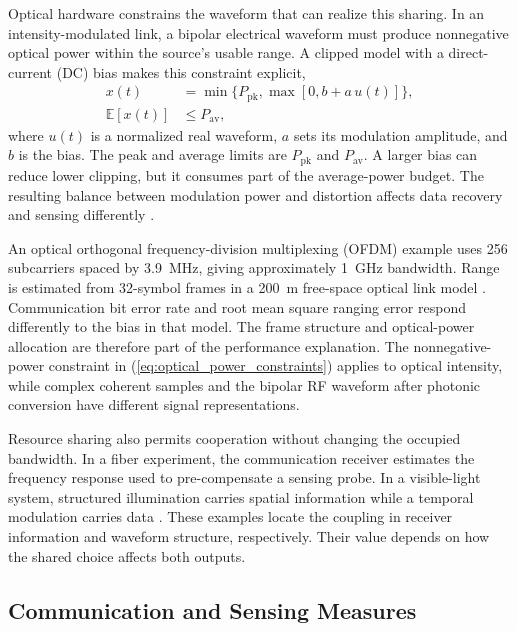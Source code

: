 Optical hardware constrains the waveform that can realize this sharing.
In an intensity-modulated link, a bipolar electrical waveform must produce
nonnegative optical power within the source's usable range. A clipped model
with a direct-current (DC) bias makes this constraint explicit,
\begin{equation}
\begin{aligned}
x(t)&=\min\{P_{\mathrm{pk}},\max[0,b+a\,u(t)]\},\\
\mathbb{E}[x(t)]&\leq P_{\mathrm{av}},
\end{aligned}
\label{eq:optical_power_constraints}
\end{equation}
where $u(t)$ is a normalized real waveform, $a$ sets its modulation amplitude,
and $b$ is the bias. The peak and average limits are $P_{\mathrm{pk}}$ and
$P_{\mathrm{av}}$. A larger bias can reduce lower clipping, but it consumes
part of the average-power budget. The resulting balance between modulation
power and distortion affects data recovery and sensing differently
\cite{Wen2024OISACArchitectures}.

An optical orthogonal frequency-division multiplexing (OFDM) example uses
256 subcarriers spaced by 3.9~MHz, giving approximately 1~GHz bandwidth.
Range is estimated from 32-symbol frames in a 200~m free-space optical link
model \cite{Wen2024OISACArchitectures}. Communication bit error rate and
root mean square ranging error respond differently to the bias in that model.
The frame structure and optical-power allocation are therefore part of the
performance explanation. The nonnegative-power constraint in
(\ref{eq:optical_power_constraints}) applies to optical intensity, while
complex coherent samples and the bipolar RF waveform after photonic
conversion have different signal representations.

Resource sharing also permits cooperation without changing the occupied
bandwidth. In a fiber experiment, the communication receiver estimates the
frequency response used to pre-compensate a sensing probe. In a visible-light
system, structured illumination carries spatial information while a temporal
modulation carries data
\cite{OISAC_SCR00057,OISAC_SCR00196}. These examples locate the coupling in
receiver information and waveform structure, respectively. Their value
depends on how the shared choice affects both outputs.

\subsection{Communication and Sensing Measures}
\label{sec:communication_sensing_measures}

